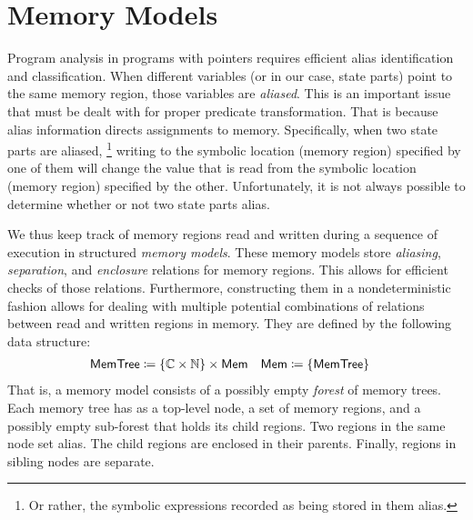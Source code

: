 \section{Memory Models}\label{sec:memory-models}
Program analysis
in programs with pointers
requires efficient alias identification and classification.
When different variables
(or in our case, state parts)
point to the same memory region, those variables are \emph{aliased}.
This is an important issue that must be dealt with for proper predicate transformation.
That is because alias information directs assignments to memory.
Specifically, when two state parts are aliased,%
\footnote{Or rather, the symbolic expressions
  recorded as being stored in them alias.}
writing to the symbolic location (memory region) specified by one of them will change the value that is read from the symbolic location (memory region) specified by the other.
Unfortunately, it is not always possible to determine whether or not
two state parts alias.

We thus keep track of memory regions read and written during a sequence of execution in structured \emph{memory models}.%
%
These memory models store \emph{aliasing}, \emph{separation},%
and \emph{enclosure}
relations for memory regions.
This allows for efficient checks of those relations.
Furthermore, constructing them in a nondeterministic
fashion allows for dealing with multiple potential combinations of relations
between read and written regions in memory.
They are defined by the following data structure:
\begin{align*}
  \mathsf{MemTree} &\coloneqq
  \{\mathbb C\times\mathbb N\}\times\mathsf{Mem}
  &
  \mathsf{Mem} &\coloneqq \{\mathsf{MemTree}\}
\end{align*}
That is,
a memory model consists of a possibly empty \emph{forest} of memory trees.%
%
Each memory tree has as a top-level node,
a set of memory regions,
and a possibly empty sub-forest that holds its child regions.
Two regions in the same node set alias.
The child regions are enclosed in their parents.
Finally, regions in sibling nodes are separate.

